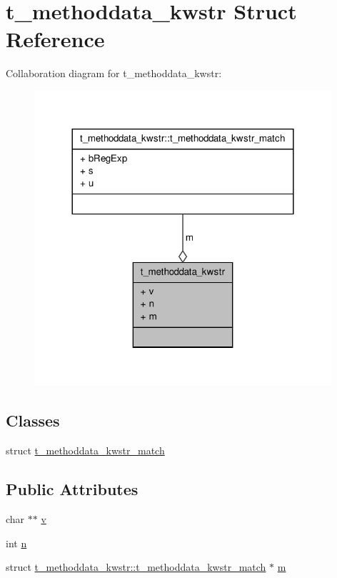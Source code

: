 \hypertarget{structt__methoddata__kwstr}{\section{t\-\_\-methoddata\-\_\-kwstr \-Struct \-Reference}
\label{structt__methoddata__kwstr}
}


\-Collaboration diagram for t\-\_\-methoddata\-\_\-kwstr\-:
\nopagebreak
\begin{figure}[H]
\begin{center}
\leavevmode
\includegraphics[width=312pt]{structt__methoddata__kwstr__coll__graph}
\end{center}
\end{figure}
\subsection*{\-Classes}
\begin{DoxyCompactItemize}
\item 
struct \hyperlink{structt__methoddata__kwstr_1_1t__methoddata__kwstr__match}{t\-\_\-methoddata\-\_\-kwstr\-\_\-match}
\end{DoxyCompactItemize}
\subsection*{\-Public \-Attributes}
\begin{DoxyCompactItemize}
\item 
char $\ast$$\ast$ \hyperlink{structt__methoddata__kwstr_acbcb7d87d36e038031f135cdc54bff67}{v}
\item 
int \hyperlink{structt__methoddata__kwstr_a96ba89545ba0b0dd6b7900989c10c076}{n}
\item 
struct \*
\hyperlink{structt__methoddata__kwstr_1_1t__methoddata__kwstr__match}{t\-\_\-methoddata\-\_\-kwstr\-::t\-\_\-methoddata\-\_\-kwstr\-\_\-match} $\ast$ \hyperlink{structt__methoddata__kwstr_aba33a96f6b5f9459fd368d525bcc6fa9}{m}
\end{DoxyCompactItemize}


